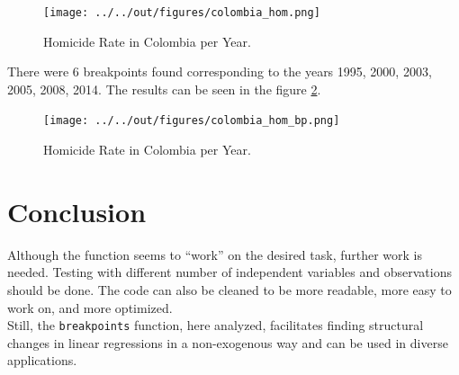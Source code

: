 \documentclass[11pt, a4paper, leqno]{article}
\begin{document}
\begin{figure}[ht]
    \centering
    \texttt{[image: ../../out/figures/colombia\_hom.png]}
    \caption{Homicide Rate in Colombia per Year.}
    \label{fig:3}

\end{figure}

There were 6 breakpoints found corresponding to the years 1995, 2000, 2003, 2005, 2008, 2014.  The results can be seen in the figure \ref{fig:4}.



\begin{figure}[ht]
    \centering
    \texttt{[image: ../../out/figures/colombia\_hom\_bp.png]}
    \caption{Homicide Rate in Colombia per Year.}
    \label{fig:4}

\end{figure}

\section{Conclusion}
\label{sec:conclusion}
Although the function seems to ``work'' on the desired task, further work is needed.  Testing with different number of independent variables and observations should be done. The code can also be cleaned to be more readable, more easy to work on, and more optimized.
\\
Still, the \texttt{breakpoints} function, here analyzed, facilitates finding structural changes in linear regressions in a non-exogenous way and can be used in diverse applications.

\newpage




\end{document}

